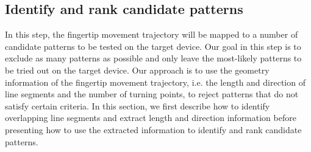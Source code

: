 \subsection{Identify and rank candidate patterns}
\label{section:spea}
  In this step, the fingertip movement trajectory will be mapped to a number of candidate patterns to be tested on the target device.
   Our goal in this step is to exclude as many patterns as possible and only leave the most-likely patterns to be tried out on the target device.
     Our approach is to use the geometry information of the fingertip movement trajectory, i.e. the length and direction of line segments and the number of turning points, to reject patterns that do not satisfy certain criteria.
    In this section, we first describe how to identify overlapping line segments and extract length and direction information before presenting how to use the extracted information to identify and rank candidate patterns.

